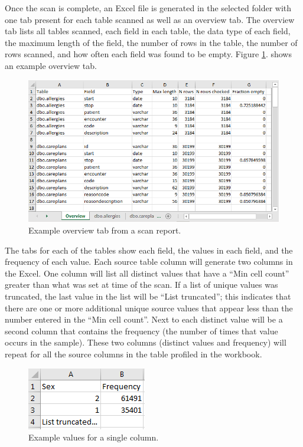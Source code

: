\documentclass[11pt]{book}
\theoremstyle{definition}
\theoremstyle{definition}
\theoremstyle{definition}
\theoremstyle{remark}
\begin{document}
Once the scan is complete, an Excel file is generated in the selected folder with one tab present for each table scanned as well as an overview tab. The overview tab lists all tables scanned, each field in each table, the data type of each field, the maximum length of the field, the number of rows in the table, the number of rows scanned, and how often each field was found to be empty. Figure \ref{fig:ScanOverviewTab}. shows an example overview tab.

\begin{figure}
\includegraphics[width=1\linewidth]{images/ExtractTransformLoad/ScanOverviewTab} \caption{Example overview tab from a scan report.}\label{fig:ScanOverviewTab}
\end{figure}

The tabs for each of the tables show each field, the values in each field, and the frequency of each value. Each source table column will generate two columns in the Excel. One column will list all distinct values that have a ``Min cell count'' greater than what was set at time of the scan. If a list of unique values was truncated, the last value in the list will be ``List truncated''; this indicates that there are one or more additional unique source values that appear less than the number entered in the ``Min cell count''. Next to each distinct value will be a second column that contains the frequency (the number of times that value occurs in the sample). These two columns (distinct values and frequency) will repeat for all the source columns in the table profiled in the workbook.

\begin{figure}
\includegraphics[width=0.3\linewidth]{images/ExtractTransformLoad/ScanSex} \caption{Example values for a single column.}\label{fig:scanSex}
\end{figure}
\end{document}
